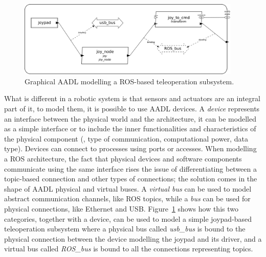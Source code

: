 \begin{figure}[t]
    \centering
    \includegraphics[width=0.95\textwidth]{gfx/mini_arch}
    \caption{Graphical AADL modelling a ROS-based teleoperation subsystem.}\label{fig:mini-arch}
\end{figure}

What is different in a robotic system is that sensors and actuators are an integral part of it, to model them, it is possible to use AADL devices. A \textit{device} represents an interface between the physical world and the architecture, it can be modelled as a simple interface or to include the inner functionalities and characteristics of the physical component (\eg, type of communication, computational power, data type).  Devices can connect to processes using ports or accesses. When modelling a ROS architecture, the fact that physical devices and software components communicate using the same interface rises the issue of differentiating between a topic-based connection and other types of connections; the solution comes in the shape of AADL physical and virtual buses. A \textit{virtual bus} can be used to model abstract communication channels, like ROS topics, while a \textit{bus} can be used for physical connections, like Ethernet and USB. Figure~\ref{fig:mini-arch} shows how this two categories, together with a device, can be used to model a simple joypad-based teleoperation subsystem where a physical bus called \textit{usb\_bus} is bound to the physical connection between the device modelling the joypad and its driver, and a virtual bus called \textit{ROS\_bus} is bound to all the connections representing topics.

